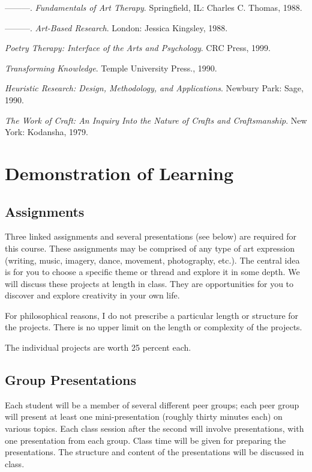 \documentclass{report}
\begin{document}
\begin{description}
\item ---------. \textit{Fundamentals of Art Therapy}. Springfield, IL: Charles C. Thomas, 1988.
\item ---------. \textit{Art-Based Research}. London: Jessica Kingsley, 1988.
\item [Mazza, Nick] \textit{Poetry Therapy: Interface of the Arts and Psychology}. CRC Press, 1999.
\item [Minnich, E. K.] \textit{Transforming Knowledge}. Temple University Press., 1990.
\item [Moustakas, C.] \textit{Heuristic Research: Design, Methodology, and Applications}. Newbury Park: Sage, 1990.
\item [Needleman, Carla] \textit{The Work of Craft: An Inquiry Into the Nature of Crafts and Craftsmanship}. New York: Kodansha, 1979.

\end{description}

\clearpage

\section{Demonstration of Learning}

\subsection{Assignments}
Three linked assignments and several presentations (see below) are required for this course. These assignments may be comprised of any type of art expression (writing, music, imagery, dance, movement, photography, etc.). The central idea is for you to choose a specific theme or thread and explore it in some depth. We will discuss these projects at length in class. They are opportunities for you to discover and explore creativity in your own life.

For philosophical reasons, I do not prescribe a particular length or structure for the projects. There is no upper limit on the length or complexity of the projects.

The individual projects are worth 25 percent each.

\newpage

\subsection{Group Presentations}

Each student will be a member of several different peer groups; each
peer group will present at least one mini-presentation (roughly thirty minutes each) on various topics. Each class session after the second will involve presentations, with one presentation from each group. Class time will be given for preparing the presentations. The structure and content of the presentations will be discussed in class.
\end{document}
